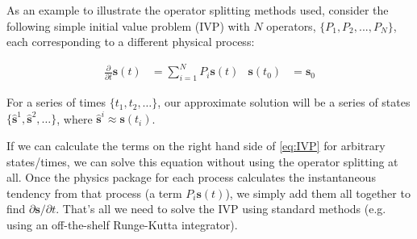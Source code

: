 \documentclass [11pt, proquest] {uwthesis}[2020/02/24]
\begin{document}
%
%

As an example to illustrate the operator splitting methods used, consider the following simple initial value problem (IVP) with $N$ operators, $\{P_1, P_2, ..., P_N\}$, each corresponding to a different physical process:

\begin{align}
    \frac{\partial}{\partial t} \mathbf{s}(t) &= \sum_{i=1}^{N} P_i \mathbf{s}(t) & \mathbf{s}(t_0) &= \mathbf{s}_0 \label{eq:IVP}
\end{align}

For a series of times $\{t_1, t_2, \dots\}$, our approximate solution will be a series of states $\{\hat{\mathbf{s}}^1, \hat{\mathbf{s}}^2, \dots\}$, where $\hat{\mathbf{s}}^i \approx \mathbf{s}(t_i)$.

If we can calculate the terms on the right hand side of \eqref{eq:IVP} for arbitrary states/times, we can solve this equation without using the operator splitting at all. Once the physics package for each process calculates the instantaneous tendency from that process (a term $P_i \mathbf{s}(t)$), we simply add them all together to find $\partial \mathbf{s}/\partial t$. That's all we need to solve the IVP using standard methods (e.g. using an off-the-shelf Runge-Kutta integrator).
\end{document}

